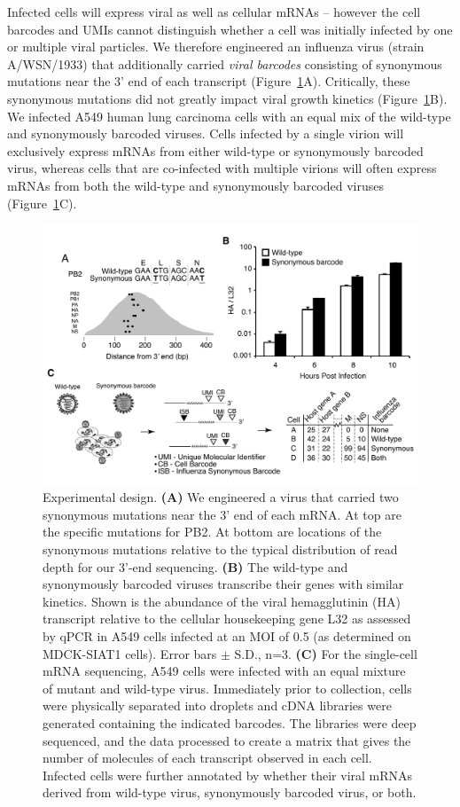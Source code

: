 \documentclass[9pt,lineno]{elife}
\begin{document}
Infected cells will express viral as well as cellular mRNAs -- however the cell barcodes and UMIs cannot distinguish whether a cell was initially infected by one or multiple viral particles.
We therefore engineered an influenza virus (strain A/WSN/1933) that additionally carried \emph{viral barcodes} consisting of synonymous mutations near the 3' end of each transcript (Figure~\ref{fig:workflow}A).
Critically, these synonymous mutations did not greatly impact viral growth kinetics (Figure~\ref{fig:workflow}B).
We infected A549 human lung carcinoma cells with an equal mix of the wild-type and synonymously barcoded viruses.
Cells infected by a single virion will exclusively express mRNAs from either wild-type or synonymously barcoded virus, whereas cells that are co-infected with multiple virions will often express mRNAs from both the wild-type and synonymously barcoded viruses (Figure~\ref{fig:workflow}C).
\begin{figure}
\centerline{\includegraphics[width=0.8\linewidth]{figures/Workflow/workflow.pdf}}
\caption{\label{fig:workflow} Experimental design.
{\bf (A)}  
We engineered a virus that carried two synonymous mutations near the 3' end of each mRNA.
At top are the specific mutations for PB2.
At bottom are locations of the synonymous mutations relative to the typical distribution of read depth for our 3'-end sequencing.
{\bf (B)} 
The wild-type and synonymously barcoded viruses transcribe their genes with similar kinetics. 
Shown is the abundance of the viral hemagglutinin (HA) transcript relative to the cellular housekeeping gene L32 as assessed by qPCR in A549 cells infected at an MOI of 0.5 (as determined on MDCK-SIAT1 cells).
Error bars $\pm$ S.D., n=3.
{\bf (C)}  
For the single-cell mRNA sequencing, A549 cells were infected with an equal mixture of mutant and wild-type virus. 
Immediately prior to collection, cells were physically separated into droplets and cDNA libraries were generated containing the indicated barcodes. 
The libraries were deep sequenced, and the data processed to create a matrix that gives the number of molecules of each transcript observed in each cell.
Infected cells were further annotated by whether their viral mRNAs derived from wild-type virus, synonymously barcoded virus, or both.
}
\end{figure}
\end{document}
